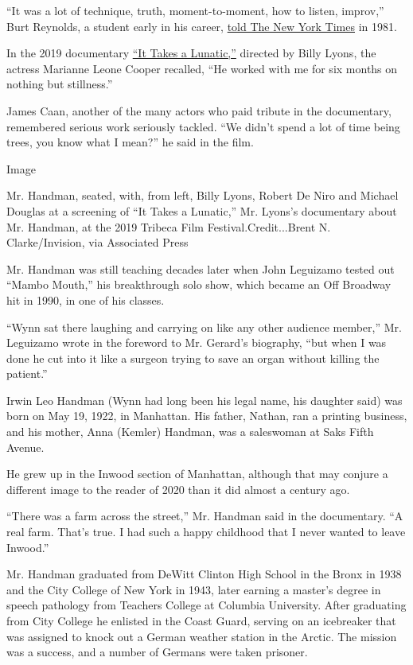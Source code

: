 ``It was a lot of technique, truth, moment-to-moment, how to listen,
improv,'' Burt Reynolds, a student early in his career,
\href{https://www.nytimes.com/1981/03/29/magazine/burt-reynolds-going-beyond-macho.html?searchResultPosition=5}{told
The New York Times} in 1981.

In the 2019 documentary
\href{https://www.netflix.com/title/81078456}{``It Takes a Lunatic,''}
directed by Billy Lyons, the actress Marianne Leone Cooper recalled,
``He worked with me for six months on nothing but stillness.''

James Caan, another of the many actors who paid tribute in the
documentary, remembered serious work seriously tackled. ``We didn't
spend a lot of time being trees, you know what I mean?'' he said in the
film.

Image

Mr. Handman, seated, with, from left, Billy Lyons, Robert De Niro and
Michael Douglas at a screening of ``It Takes a Lunatic,'' Mr. Lyons's
documentary about Mr. Handman, at the 2019 Tribeca Film
Festival.Credit...Brent N. Clarke/Invision, via Associated Press

Mr. Handman was still teaching decades later when John Leguizamo tested
out ``Mambo Mouth,'' his breakthrough solo show, which became an Off
Broadway hit in 1990, in one of his classes.

``Wynn sat there laughing and carrying on like any other audience
member,'' Mr. Leguizamo wrote in the foreword to Mr. Gerard's biography,
``but when I was done he cut into it like a surgeon trying to save an
organ without killing the patient.''

Irwin Leo Handman (Wynn had long been his legal name, his daughter said)
was born on May 19, 1922, in Manhattan. His father, Nathan, ran a
printing business, and his mother, Anna (Kemler) Handman, was a
saleswoman at Saks Fifth Avenue.

He grew up in the Inwood section of Manhattan, although that may conjure
a different image to the reader of 2020 than it did almost a century
ago.

``There was a farm across the street,'' Mr. Handman said in the
documentary. ``A real farm. That's true. I had such a happy childhood
that I never wanted to leave Inwood.''

Mr. Handman graduated from DeWitt Clinton High School in the Bronx in
1938 and the City College of New York in 1943, later earning a master's
degree in speech pathology from Teachers College at Columbia University.
After graduating from City College he enlisted in the Coast Guard,
serving on an icebreaker that was assigned to knock out a German weather
station in the Arctic. The mission was a success, and a number of
Germans were taken prisoner.

